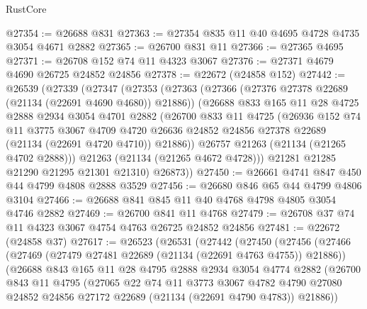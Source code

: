\begin{lexlean}{RustCore}
\begin{coremodule}
@27354 := @26688 @831
@27363 := @27354 @835 @11 @40 @4695 @4728 @4735 @3054 @4671 @2882
@27365 := @26700 @831 @11
@27366 := @27365 @4695
@27371 := @26708 @152 @74 @11 @4323 @3067
@27376 := @27371 @4679 @4690 @26725 @24852 @24856
@27378 := @22672 (@24858 @152)
@27442 := @26539
    (@27339
      (@27347
        (@27353
          (@27363
            (@27366 (@27376 @27378 @22689 (@21134 (@22691 @4690 @4680)) @21886))
            (@26688
              @833
              @165
              @11
              @28
              @4725
              @2888
              @2934
              @3054
              @4701
              @2882
              (@26700
                @833
                @11
                @4725
                (@26936
                  @152
                  @74
                  @11
                  @3775
                  @3067
                  @4709
                  @4720
                  @26636
                  @24852
                  @24856
                  @27378
                  @22689
                  (@21134 (@22691 @4720 @4710))
                  @21886))
              @26757
              @21263
              (@21134 (@21265 @4702 @2888)))
            @21263
            (@21134 (@21265 @4672 @4728)))
          @21281
          @21285
          @21290
          @21295
          @21301
          @21310)
        @26873))
@27450 := @26661 @4741 @847 @450 @44 @4799 @4808 @2888 @3529
@27456 := @26680 @846 @65 @44 @4799 @4806 @3104
@27466 := @26688 @841 @845 @11 @40 @4768 @4798 @4805 @3054 @4746 @2882
@27469 := @26700 @841 @11 @4768
@27479 := @26708 @37 @74 @11 @4323 @3067 @4754 @4763 @26725 @24852 @24856
@27481 := @22672 (@24858 @37)
@27617 := @26523
    (@26531
      (@27442
        (@27450
          (@27456
            (@27466
              (@27469 (@27479 @27481 @22689 (@21134 (@22691 @4763 @4755)) @21886))
              (@26688
                @843
                @165
                @11
                @28
                @4795
                @2888
                @2934
                @3054
                @4774
                @2882
                (@26700
                  @843
                  @11
                  @4795
                  (@27065
                    @22
                    @74
                    @11
                    @3773
                    @3067
                    @4782
                    @4790
                    @27080
                    @24852
                    @24856
                    @27172
                    @22689
                    (@21134 (@22691 @4790 @4783))
                    @21886))

\end{coremodule}
\end{lexlean}
